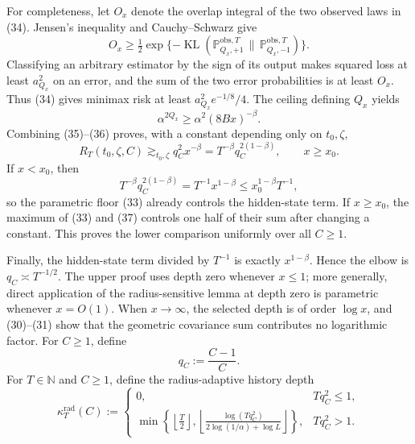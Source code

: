 For completeness, let \(O_x\) denote the overlap integral of the two observed laws in (34).  Jensen's inequality and Cauchy--Schwarz give
\[
 O_x\ge\tfrac12\exp\{-\operatorname{KL}(\mathbb P_{Q_x,+1}^{\mathrm{obs},T}\,\|\,
                                             \mathbb P_{Q_x,-1}^{\mathrm{obs},T})\}.
\]
Classifying an arbitrary estimator by the sign of its output makes squared loss at least \(a_{Q_x}^2\) on an error, and the sum of the two error probabilities is at least \(O_x\).  Thus (34) gives minimax risk at least \(a_{Q_x}^2e^{-1/8}/4\).  The ceiling defining \(Q_x\) yields
\[
 \alpha^{2Q_x}\ge\alpha^2(8Bx)^{-\beta}. \tag{36}
\]
Combining (35)--(36) proves, with a constant depending only on \(t_0,\zeta\),
\[
 R_T(t_0,\zeta,C)
 \gtrsim_{t_0,\zeta}q_C^2x^{-\beta}
 =T^{-\beta}q_C^{2(1-\beta)},
 \qquad x\ge x_0. \tag{37}
\]
If \(x<x_0\), then
\[
 T^{-\beta}q_C^{2(1-\beta)}
 =T^{-1}x^{1-\beta}
 \le x_0^{1-\beta}T^{-1},
\]
so the parametric floor (33) already controls the hidden-state term.  If \(x\ge x_0\), the maximum of (33) and (37) controls one half of their sum after changing a constant.  This proves the lower comparison uniformly over all \(C\ge1\).

Finally, the hidden-state term divided by \(T^{-1}\) is exactly \(x^{1-\beta}\).  Hence the elbow is \(q_C\asymp T^{-1/2}\).  The upper proof uses depth zero whenever \(x\le1\); more generally, direct application of the radius-sensitive lemma at depth zero is parametric whenever \(x=O(1)\).  When \(x\to\infty\), the selected depth is of order \(\log x\), and (30)--(31) show that the geometric covariance sum contributes no logarithmic factor.
For \(C\ge1\), define
\[
 q_C:=\frac{C-1}{C}.
\]
For \(T\in\mathbb N\) and \(C\ge1\), define the radius-adaptive history depth
\[
 \kappa_T^{\mathrm{rad}}(C):=
 \begin{cases}
 0, & Tq_C^2\le1,\\[3pt]
 \displaystyle
 \min\!\left\{\left\lfloor\frac T2\right\rfloor,
 \left\lfloor\frac{\log(Tq_C^2)}{2\log(1/\alpha)+\log L}\right\rfloor\right\},
 & Tq_C^2>1.
 \end{cases}
\]
